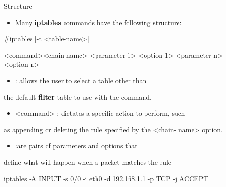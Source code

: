\begin{frame}[t,allowframebreaks]{Structure}
  \fontsize{15}{18}\selectfont
  \begin{itemize}
    \item Many \textcolor{CommandGreen}{\bfseries iptables} commands have the following structure:
  \end{itemize}
  \vspace{0.08cm}
  {\color{CommandGreen}\ttfamily\fontsize{13.5}{16.5}\selectfont \#iptables [-t <table-name>]\par}
  <command><chain-name> <parameter-1> <option-1> <parameter-n><option-n>\par
  \begin{itemize}
    \item <table-name> : allows the user to select a table other than
  \end{itemize}
  the default \textcolor{CommandGreen}{\bfseries filter} table to use with the command.\par
  \begin{itemize}
    \item <command> : dictates a specific action to perform, such
  \end{itemize}
  as appending or deleting the rule specified by the <chain- name> option.\par
  \begin{itemize}
    \item <chain-name> :are pairs of parameters and options that
  \end{itemize}
  define what will happen when a packet matches the rule\par
  \vspace{0.08cm}
  {\color{CommandGreen}\ttfamily\fontsize{13.5}{16.5}\selectfont iptables -A INPUT -s 0/0 -i eth0 -d 192.168.1.1 -p TCP -j ACCEPT\par}
\end{frame}
